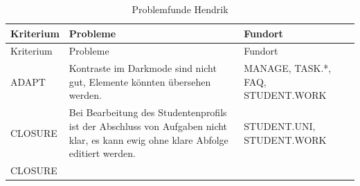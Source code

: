\documentclass[
  12pt,
  ngerman,
  a4paper,
]{article}
\begin{document}
\begin{longtable}[]{@{}lll@{}}
\caption{Problemfunde Hendrik \label{tbl:heur:hendrik}}\tabularnewline
\toprule
\begin{minipage}[b]{0.15\columnwidth}\raggedright
Kriterium\strut
\end{minipage} & \begin{minipage}[b]{0.49\columnwidth}\raggedright
Probleme\strut
\end{minipage} & \begin{minipage}[b]{0.27\columnwidth}\raggedright
Fundort\strut
\end{minipage}\tabularnewline
\midrule
\endfirsthead
\toprule
\begin{minipage}[b]{0.15\columnwidth}\raggedright
Kriterium\strut
\end{minipage} & \begin{minipage}[b]{0.49\columnwidth}\raggedright
Probleme\strut
\end{minipage} & \begin{minipage}[b]{0.27\columnwidth}\raggedright
Fundort\strut
\end{minipage}\tabularnewline
\midrule
\endhead
\begin{minipage}[t]{0.15\columnwidth}\raggedright
ADAPT\strut
\end{minipage} & \begin{minipage}[t]{0.49\columnwidth}\raggedright
Kontraste im Darkmode sind nicht gut, Elemente könnten übersehen
werden.\strut
\end{minipage} & \begin{minipage}[t]{0.27\columnwidth}\raggedright
MANAGE, TASK.*, FAQ, STUDENT.WORK\strut
\end{minipage}\tabularnewline
\begin{minipage}[t]{0.15\columnwidth}\raggedright
CLOSURE\strut
\end{minipage} & \begin{minipage}[t]{0.49\columnwidth}\raggedright
Bei Bearbeitung des Studentenprofils ist der Abschluss von Aufgaben
nicht klar, es kann ewig ohne klare Abfolge editiert werden.\strut
\end{minipage} & \begin{minipage}[t]{0.27\columnwidth}\raggedright
STUDENT.UNI, STUDENT.WORK\strut
\end{minipage}\tabularnewline
\begin{minipage}[t]{0.15\columnwidth}\raggedright
CLOSURE\strut
\end{minipage} & \begin{minipage}[t]{0.49\columnwidth}\raggedright

\end{minipage}
\end{longtable}
\end{document}
